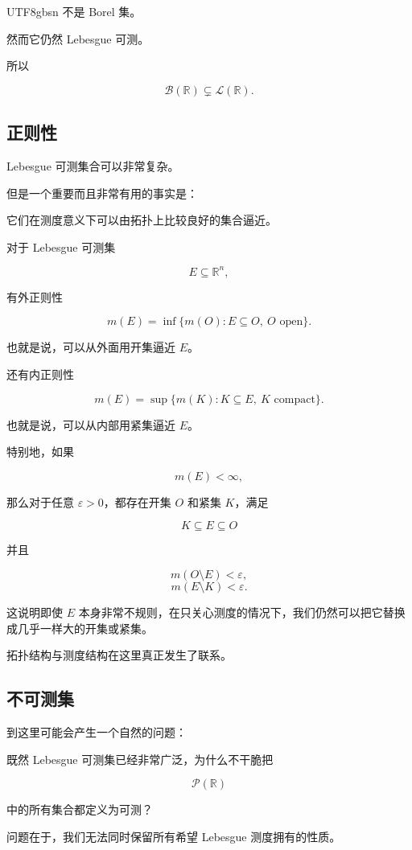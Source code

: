\documentclass[11pt]{article}
\begin{document}
\begin{CJK*}{UTF8}{gbsn}
不是 Borel 集。

然而它仍然 Lebesgue 可测。

所以

\[
\mathcal{B}(\mathbb{R})\subsetneq\mathcal{L}(\mathbb{R}).
\]

\subsection{正则性}

Lebesgue 可测集合可以非常复杂。

但是一个重要而且非常有用的事实是：

它们在测度意义下可以由拓扑上比较良好的集合逼近。

对于 Lebesgue 可测集

\[
E\subseteq\mathbb{R}^{n},
\]

有外正则性

\[
m(E)=\inf\{m(O):E\subseteq O,\ O\text{ open}\}.
\]

也就是说，可以从外面用开集逼近 $E$。

还有内正则性

\[
m(E)=\sup\{m(K):K\subseteq E,\ K\text{ compact}\}.
\]

也就是说，可以从内部用紧集逼近 $E$。

特别地，如果

\[
m(E)<\infty,
\]

那么对于任意 $\varepsilon>0$，都存在开集 $O$ 和紧集 $K$，满足

\[
K\subseteq E\subseteq O
\]

并且

\[
m(O\setminus E)<\varepsilon,
\]
\[
m(E\setminus K)<\varepsilon.
\]

这说明即使 $E$ 本身非常不规则，在只关心测度的情况下，我们仍然可以把它替换成几乎一样大的开集或紧集。

拓扑结构与测度结构在这里真正发生了联系。

\subsection{不可测集}

到这里可能会产生一个自然的问题：

既然 Lebesgue 可测集已经非常广泛，为什么不干脆把

\[
\mathcal{P}(\mathbb{R})
\]

中的所有集合都定义为可测？

问题在于，我们无法同时保留所有希望 Lebesgue 测度拥有的性质。


\end{CJK*}
\end{document}
